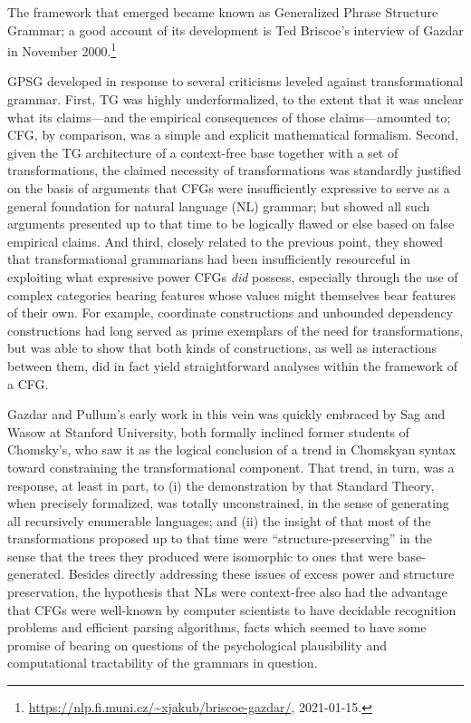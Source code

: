 \documentclass[output=paper,biblatex,babelshorthands,newtxmath,draftmode,colorlinks,citecolor=brown]{langscibook}
\begin{document}
\noindent
The framework that emerged became known as Generalized Phrase Structure Grammar\indexgpsg; a good account of its development is Ted Briscoe's interview of Gazdar in November 2000.\footnote{\url{https://nlp.fi.muni.cz/~xjakub/briscoe-gazdar/}, 2021-01-15.}

GPSG developed in response to several criticisms leveled against transformational grammar. First, TG
was highly underformalized, to the extent that it was unclear what its claims---and the empirical
consequences of those claims---amounted to; CFG, by comparison, was a simple and explicit
mathematical formalism. Second, given the TG architecture of a context-free base together with a set
of transformations, the claimed necessity of transformations was standardly justified on the basis
of arguments that CFGs were insufficiently expressive to serve as a general foundation for natural
language (NL) grammar; but \citet{PG82a-u} showed all such arguments presented up to that time to be
logically flawed or else based on false empirical claims. And third, closely related to the previous
point, they showed that transformational grammarians had been insufficiently resourceful in
exploiting what expressive power CFGs \emph{did} possess, especially through the use of complex
categories bearing features whose values might themselves bear features of their own.  For example,
coordinate constructions and unbounded dependency
constructions had long served as prime exemplars of the need for transformations, but
\citet{Gazdar81a} was able to show that both kinds of constructions, as well as interactions between
them, did in fact yield straightforward analyses within the framework of a CFG.
 
Gazdar and Pullum's early work in this vein was quickly embraced by Sag and Wasow at Stanford
University, both formally inclined former students of Chomsky's, who saw it as the logical
conclusion of a trend in Chomskyan syntax toward constraining the transformational component. That
trend, in turn, was a response, at least in part, to (i) the demonstration by \citet{PR73a-u} that
 Standard Theory, when precisely formalized, was totally unconstrained, in the
sense of generating all recursively enumerable languages; and (ii) the insight of
\citet{Emonds76a-u} that most of the transformations proposed up to that time were
``structure-preserving'' in the sense that the trees they produced were isomorphic to ones that were
base-generated. Besides directly addressing these issues of excess power and structure preservation,
the hypothesis that NLs were context-free also had the advantage that CFGs were well-known by
computer scientists to have decidable recognition problems and efficient parsing algorithms, facts
which seemed to have some promise of bearing on questions of the psychological plausibility and
computational tractability of the grammars in question.
\end{document}
